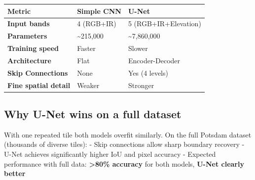 \documentclass[11pt]{article}
\begin{document}
\begin{longtable}[]{@{}lll@{}}
\toprule\noalign{}
Metric & Simple CNN & U-Net \\
\midrule\noalign{}
\endhead
\bottomrule\noalign{}
\endlastfoot
\textbf{Input bands} & 4 (RGB+IR) & 5 (RGB+IR+Elevation) \\
\textbf{Parameters} & \textasciitilde215,000 &
\textasciitilde7,860,000 \\
\textbf{Training speed} & Faster & Slower \\
\textbf{Architecture} & Flat & Encoder-Decoder \\
\textbf{Skip Connections} & None & Yes (4 levels) \\
\textbf{Fine spatial detail} & Weaker & Stronger \\
\end{longtable}

\subsection{Why U-Net wins on a full
dataset}\label{why-u-net-wins-on-a-full-dataset}

With one repeated tile both models overfit similarly. On the full
Potsdam dataset (thousands of diverse tiles): - Skip connections allow
sharp boundary recovery - U-Net achieves significantly higher IoU and
pixel accuracy - Expected performance with full data:
\textbf{\textgreater80\% accuracy} for both models, \textbf{U-Net
clearly better}
\end{document}
